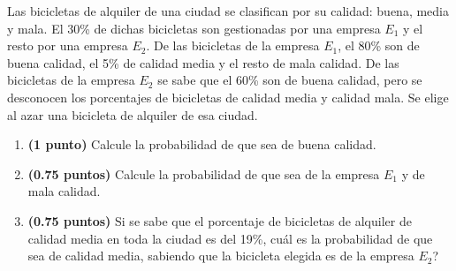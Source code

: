 
Las bicicletas de alquiler de una ciudad se clasifican por su calidad:
buena, media y mala. El 30\% de dichas bicicletas son gestionadas por una
empresa $E_1$ y el resto por una empresa $E_2$. De las bicicletas de la empresa
$E_1$, el 80\% son de buena calidad, el 5\% de calidad media y el resto de mala
calidad. De las bicicletas de la empresa $E_2$ se sabe que el 60\% son de buena
calidad, pero se desconocen los porcentajes de bicicletas de calidad media
y calidad mala. Se elige al azar una bicicleta de alquiler de esa ciudad.
\begin{enumerate}[label=\alph*)]
  \item \textbf{(1 punto)} Calcule la probabilidad de que sea de buena calidad.
  \item \textbf{(0.75 puntos)} Calcule la probabilidad de que sea de la empresa
  $E_1$ y de mala calidad.
  \item \textbf{(0.75 puntos)} Si se sabe que el porcentaje de bicicletas de
  alquiler de calidad media en toda la ciudad es del 19\%,
  \textquestiondown{}cuál es la probabilidad de que sea de calidad media,
  sabiendo que la bicicleta elegida es de la empresa $E_2$?
\end{enumerate}
